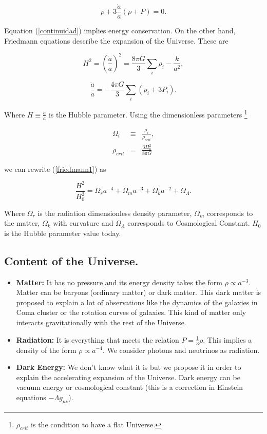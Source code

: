 \documentclass[onecolumn,           %
               showpacs,            %
               preprintnumbers,     %
               aps,                 %
               prl,          	    %
               letterpaper,             %
               superscriptaddress,      %
               nofootinbib,         %
               tightenlines,        %
               floats,floatfix      %
               ,usenatbib,
               ]{revtex4-1}
\begin{document}
\begin{equation}
\label{continuidad}
\dot{\rho} + 3 \frac{\dot{a}}{a} \left(\rho + P\right) = 0.
\end{equation}

Equation (\ref{continuidad}) implies energy conservation. On the other hand, Friedmann equations describe the expansion of the Universe. These are

\begin{equation}
\label{friedmann1}
H^2 = \left(\frac{\dot{a}}{a}\right)^2 = \frac{8 \pi G}{3} \sum_{i}\rho_{i} - \frac{k}{a^2} ,
\end{equation}

\begin{equation}
\frac{\ddot{a}}{a} = -\frac{4 \pi G}{3} \sum_{i}\left(\rho_i + 3P_i\right) .
\end{equation}

Where $H \equiv \frac{\dot{a}}{a}$ is the Hubble parameter. Using the dimensionless parameters \footnote{$\rho_{crit}$ is the condition to have a flat Universe.}

\begin{eqnarray}
\Omega_{i} &\equiv& \frac{\rho_i}{\rho_{crit}},\\
\rho_{crit} &=& \frac{3H_0^2}{8 \pi G}
\end{eqnarray} 

we can rewrite (\ref{friedmann1}) as

\begin{equation}
\frac{H^2}{H_0^2} = \Omega_r a^{-4} + \Omega_m a^{-3} + \Omega_k a^{-2} + \Omega_{\Lambda} .
\end{equation}

Where $\Omega_r$ is the radiation dimensionless density parameter, $\Omega_m$ corresponds to the matter, $\Omega_k$ with curvature and $\Omega_{\Lambda}$ corresponds to Cosmological Constant. $H_0$ is the Hubble parameter value today.

\subsection{Content of the Universe.}

\begin{itemize}
	\item \textbf{Matter:} It has no pressure and its energy density takes the form $\rho \propto a^{-3}.$ Matter can be baryons (ordinary matter) or dark matter. This dark matter is proposed to explain a lot of observations like the dynamics of the galaxies in Coma cluster or the rotation curves of galaxies. This kind of matter only interacts gravitationally with the rest of the Universe.
	\item \textbf{Radiation:} It is everything that meets the relation $P = \frac{1}{3} \rho$. This implies a density of the form $\rho \propto a^{-4}$. We consider photons and neutrinos as radiation.
	\item \textbf{Dark Energy:} We don't know what it is but we propose it in order to explain the accelerating expansion of the Universe. Dark energy can be vacuum energy or cosmological constant (this is a correction in Einstein equations $-\Lambda g_{\mu \nu}$).
\end{itemize}
\end{document}
